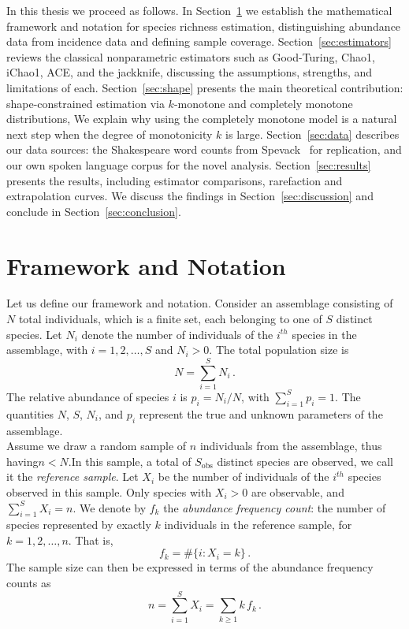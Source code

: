\documentclass{article}
\begin{document}
In this thesis we proceed as follows. In Section~\ref{sec:framework} we establish the mathematical framework and notation for species richness estimation, distinguishing abundance data from incidence data and defining sample coverage. Section~\ref{sec:estimators} reviews the classical nonparametric estimators such as Good-Turing, Chao1, iChao1, ACE, and the jackknife, discussing the assumptions, strengths, and limitations of each. Section~\ref{sec:shape} presents the main theoretical contribution: shape-constrained estimation via $k$-monotone and completely monotone distributions, We explain why using the completely monotone model is a natural next step when the degree of monotonicity $k$ is large.
Section~\ref{sec:data} describes our data sources: the Shakespeare word counts from Spevack~\cite{spevack1968} for replication, and our own spoken language corpus for the novel analysis. Section~\ref{sec:results} presents the results, including estimator comparisons, rarefaction and extrapolation curves. We discuss the findings in Section~\ref{sec:discussion} and conclude in Section~\ref{sec:conclusion}.


\section{Framework and Notation}\label{sec:framework}

Let us define our framework and notation. Consider an assemblage consisting of $N$ total individuals, which is a finite set, each belonging to one of $S$ distinct species. Let $N_i$ denote the number of individuals of the $i^{th}$ species in the assemblage, with $i = 1, 2, \ldots, S$ and $N_i > 0$. The total population size is
\[
    N = \sum_{i=1}^{S} N_i\,.
\]
The relative abundance of species $i$ is $p_i = N_i / N$, with 
$\sum_{i=1}^{S} p_i = 1$. The quantities $N$, $S$, $N_i$, and $p_i$ 
represent the true and unknown parameters of the assemblage.\\

Assume we draw a random sample of $n$ individuals from the assemblage, thus having\quad $n<N$.\quad In this sample, a total of $S_{\mathrm{obs}}$ distinct species are observed, we call it the \emph{reference sample}. Let $X_i$ be the number of individuals of the $i^{th}$ species observed in this sample. Only species with $X_i > 0$ are observable, and $\sum_{i=1}^{S} X_i = n$. We denote by $f_k$ the \emph{abundance frequency count}: the number of species represented by exactly $k$ individuals in the reference sample, for $k = 1, 2, \ldots, n$. That is,
\[
    f_k = \#\{i : X_i = k\}\,.
\]
The sample size can then be expressed in terms of the abundance frequency counts as
\[
    n = \sum_{i=1}^{S} X_i = \sum_{k \geq 1} k\, f_k\,.
\]
\end{document}
